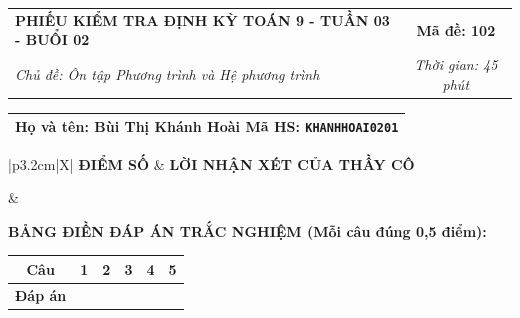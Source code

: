 \documentclass[12pt,a4paper]{article}
\begin{document}
\newpage


\noindent
\begin{tabularx}{\linewidth}{|X|c|}
\hline
\textbf{PHIẾU KIỂM TRA ĐỊNH KỲ TOÁN 9 - TUẦN 03 - BUỔI 02} & \textbf{Mã đề: 102} \\
\textit{Chủ đề: Ôn tập Phương trình và Hệ phương trình} & \textit{Thời gian: 45 phút} \\
\hline
\end{tabularx}

\vspace{1mm}

\noindent
\begin{tabularx}{\linewidth}{|X|}
\hline
\rule[-2mm]{0pt}{7.5mm}\textbf{Họ và tên:} \textbf{\large Bùi Thị Khánh Hoài} \hfill \textbf{Mã HS:} \texttt{KHANHHOAI0201} \quad \\
\hline
\end{tabularx}

\vspace{1mm}

\noindent
\begin{tabularx}{\linewidth}{|p{3.2cm}|X|}
\hline
\centering\textbf{ĐIỂM SỐ} & \centering\textbf{LỜI NHẬN XÉT CỦA THẦY CÔ} \tabularnewline
\hline
\rule{0pt}{1.3cm} & \tabularnewline
\hline
\end{tabularx}

\vspace{1.2mm}

\noindent\textbf{BẢNG ĐIỀN ĐÁP ÁN TRẮC NGHIỆM (Mỗi câu đúng 0,5 điểm):}
\vspace{0.8mm}

\noindent
\renewcommand{\arraystretch}{1.35}
\begin{tabularx}{\linewidth}{|c|*{5}{>{\centering\arraybackslash}X|}}
\hline
\textbf{Câu} & \textbf{1} & \textbf{2} & \textbf{3} & \textbf{4} & \textbf{5} \\
\hline
\textbf{Đáp án} & & & & & \\
\hline
\end{tabularx}
\renewcommand{\arraystretch}{1.0}

\vspace{1.5mm}
\end{document}
